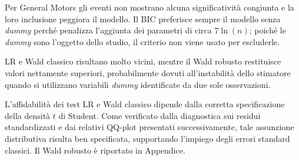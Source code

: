 Per General Motors gli eventi non mostrano alcuna significatività congiunta e la loro inclusione peggiora il modello. Il BIC preferisce sempre il modello senza \emph{dummy} 
perché penalizza l'aggiunta dei parametri di circa $7 \ln(n)$; poiché le \emph{dummy} sono l'oggetto dello studio, il criterio non viene usato per escluderle.

LR e Wald classico risultano molto vicini, mentre il Wald robusto restituisce valori nettamente superiori, probabilmente dovuti all'instabilità dello stimatore quando 
si utilizzano variabili \emph{dummy} identificate da due sole osservazioni.

L'affidabilità dei test LR e Wald classico dipende dalla corretta specificazione della densità $t$ di Student. Come verificato dalla diagnostica sui residui standardizzati 
e dai relativi QQ-plot presentati successivamente, tale assunzione distributiva risulta ben specificata, supportando l'impiego degli errori standard classici. Il Wald 
robusto è riportato in Appendice.

